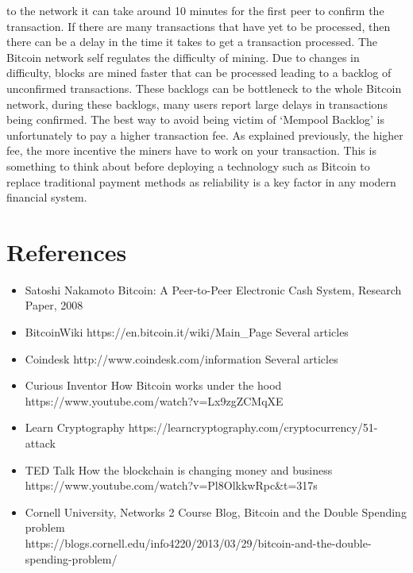 \documentclass[10pt, a4paper]{report}
\begin{document}
to the network it can take around 10 minutes for the first peer to confirm the transaction.
If there are many transactions that have yet to be processed, then there can be
a delay in the time it takes to get a transaction processed.
The Bitcoin network self regulates the difficulty of mining.
Due to changes in difficulty, blocks are mined faster that can be processed leading
to a backlog of unconfirmed transactions. These backlogs can be bottleneck to the whole Bitcoin network,
during these backlogs, many users report large delays in transactions being confirmed.
The best way to avoid being victim of `Mempool Backlog' is unfortunately to pay a higher transaction fee.
As explained previously, the higher fee, the more incentive the miners have to work on your transaction.
This is something to think about before deploying a technology such as Bitcoin to replace
traditional payment methods as reliability is a key factor in any modern financial system.

\section*{References}

\begin{itemize}
    \item{Satoshi Nakamoto \- Bitcoin: A Peer-to-Peer Electronic Cash System, Research Paper, 2008}
    \item{BitcoinWiki \- https://en.bitcoin.it/wiki/Main\_Page} \- Several articles
    \item{Coindesk \- http://www.coindesk.com/information \- Several articles}
    \item{Curious Inventor \- How Bitcoin works under the hood \- https://www.youtube.com/watch?v=Lx9zgZCMqXE}
    \item{Learn Cryptography \- https://learncryptography.com/cryptocurrency/51-attack}
    \item{TED Talk \- How the blockchain is changing money and business \- https://www.youtube.com/watch?v=Pl8OlkkwRpc&t=317s}
    \item{Cornell University, Networks 2 Course Blog, Bitcoin and the Double Spending problem\\ \- https://blogs.cornell.edu/info4220/2013/03/29/bitcoin-and-the-double-spending-problem/}
\end{itemize}
\end{document}
